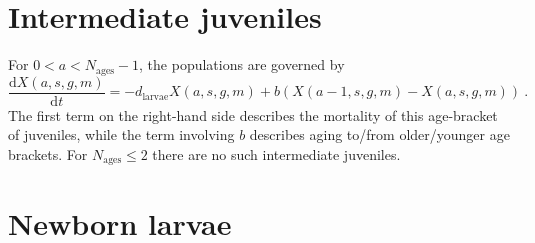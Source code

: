 \documentclass[11pt,a4paper]{article}
\begin{document}
\section{Intermediate juveniles}

For $0<a<N_{\mathrm{ages}}-1$, the populations are governed by
\begin{equation}
\frac{\mathrm{d}X(a, s, g, m)}{\mathrm{d} t} = -d_{\mathrm{larvae}}X(a, s, g, m) + b \left(X(a-1, s, g, m) - X(a, s, g, m) \right) \ .
\end{equation}
The first term on the right-hand side describes the mortality of this age-bracket of juveniles, while the term involving $b$ describes aging to/from older/younger age brackets.  For $N_{\mathrm{ages}}\leq 2$ there are no such intermediate juveniles.  

\section{Newborn larvae}
\end{document}
